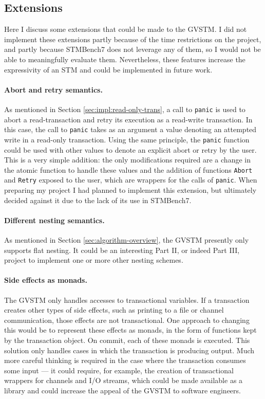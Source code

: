 \documentclass[12pt,a4paper,oneside,openright]{report}
\newcommand{\goFunc}[1]{\texttt{#1}}
\begin{document}
\subsection{Extensions}
\label{sec:impl:extensions}

Here I discuss some extensions that could be made to the GVSTM. I did
not implement these extensions partly because of the time restrictions
on the project, and partly because STMBench7 does not leverage any of
them, so I would not be able to meaningfully evaluate
them. Nevertheless, these features increase the expressivity of an STM
and could be implemented in future work.

\paragraph{Abort and retry semantics.} As mentioned in Section
\ref{sec:impl:read-only-trans}, a call to \goFunc{panic} is used to
abort a read-transaction and retry its execution as a read-write
transaction. In this case, the call to \goFunc{panic} takes as an
argument a value denoting an attempted write in a read-only
transaction. Using the same principle, the \goFunc{panic} function
could be used with other values to denote an explicit abort or retry
by the user. This is a very simple addition: the only modifications
required are a change in the atomic function to handle these values
and the addition of functions \goFunc{Abort} and \goFunc{Retry}
exposed to the user, which are wrappers for the calls of
\goFunc{panic}. When preparing my project I had planned to implement
this extension, but ultimately decided against it due to the lack of
its use in STMBench7.

\paragraph{Different nesting semantics.} As mentioned in Section
\ref{sec:algorithm-overview}, the GVSTM presently only supports flat
nesting. It could be an interesting Part II, or indeed Part III,
project to implement one or more other nesting schemes.

\paragraph{Side effects as monads.} The GVSTM only handles accesses to
transactional variables. If a transaction creates other types of side
effects, such as printing to a file or channel communication, those
effects are not transactional. One approach to changing this would be
to represent these effects as monads, in the form of functions kept by
the transaction object. On commit, each of these monads is
executed. This solution only handles cases in which the transaction is
producing output. Much more careful thinking is required in the case
where the transaction consumes some input --- it could require, for
example, the creation of transactional wrappers for channels and I/O
streams, which could be made available as a library and could increase
the appeal of the GVSTM to software engineers.
\end{document}
